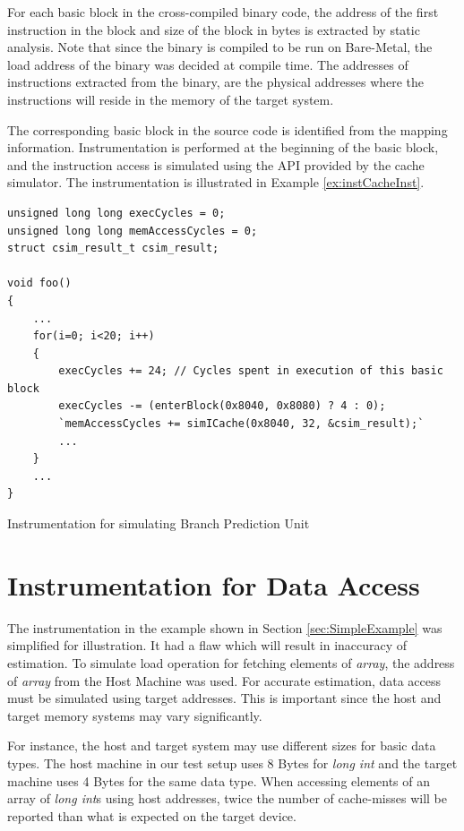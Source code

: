 For each basic block in the cross-compiled binary code, the address of the first instruction in the block and size of the block in bytes is extracted by static analysis. Note that since the binary is compiled to be run on Bare-Metal, the load address of the binary was decided at compile time. The addresses of instructions extracted from the binary, are the physical addresses where the instructions will reside in the memory of the target system.

The corresponding basic block in the source code is identified from the mapping information. Instrumentation is performed at the beginning of the basic block, and the instruction access is simulated using the API provided by the cache simulator. The instrumentation is illustrated in Example \ref{ex:instCacheInst}.

\vspace*{10pt}
\begin{Example}[h!]
\begin{lstlisting}
unsigned long long execCycles = 0;
unsigned long long memAccessCycles = 0;
struct csim_result_t csim_result;

void foo()
{
    ...
    for(i=0; i<20; i++)
    {
        execCycles += 24; // Cycles spent in execution of this basic block
        execCycles -= (enterBlock(0x8040, 0x8080) ? 4 : 0);
        `memAccessCycles += simICache(0x8040, 32, &csim_result);`
        ...
    }
    ...
}
\end{lstlisting}
\caption{Instrumentation for simulating Branch Prediction Unit}
\label{ex:instCacheInst}
\end{Example}

\section{Instrumentation for Data Access}
The instrumentation in the example shown in Section \ref{sec:SimpleExample} was simplified for illustration. It had a flaw which will result in inaccuracy of estimation. To simulate load operation for fetching elements of \emph{array}, the address of \emph{array} from the Host Machine was used. For accurate estimation, data access must be simulated using target addresses. This is important since the host and target memory systems may vary significantly. 

For instance, the host and target system may use different sizes for basic data types. The host machine in our test setup uses 8 Bytes for \emph{long int} and the target machine uses 4 Bytes for the same data type. When accessing elements of an array of \emph{long int}s using host addresses, twice the number of cache-misses will be reported than what is expected on the target device.

